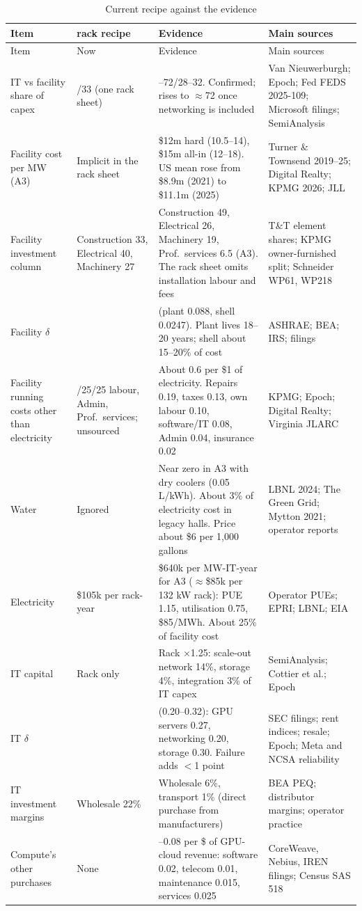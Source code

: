 \begin{longtable}{>{\raggedright\arraybackslash}p{2.8cm}>{\raggedright\arraybackslash}p{3.0cm}>{\raggedright\arraybackslash}p{4.8cm}>{\raggedright\arraybackslash}p{3.8cm}}
\caption{Current recipe against the evidence}\label{tab:changes}\\
\toprule
Item & 2026 rack recipe & Evidence & Main sources \\
\midrule\endfirsthead
\toprule
Item & Now & Evidence & Main sources \\
\midrule\endhead
IT vs facility share of capex & 67/33 (one rack sheet) & 68--72/28--32. Confirmed; rises to $\approx$72 once networking is included & Van Nieuwerburgh; Epoch; Fed FEDS 2025-109; Microsoft filings; SemiAnalysis \\
Facility cost per MW (A3) & Implicit in the rack sheet & \$12m hard (10.5--14), \$15m all-in (12--18). US mean rose from \$8.9m (2021) to \$11.1m (2025) & Turner \& Townsend 2019--25; Digital Realty; KPMG 2026; JLL \\
Facility investment column & Construction 33, Electrical 40, Machinery 27 & Construction 49, Electrical 26, Machinery 19, Prof.\ services 6.5 (A3). The rack sheet omits installation labour and fees & T\&T element shares; KPMG owner-furnished split; Schneider WP61, WP218 \\
Facility $\delta$ & 0.075 & 0.078 (plant 0.088, shell 0.0247). Plant lives 18--20 years; shell about 15--20\% of cost & ASHRAE; BEA; IRS; filings \\
Facility running costs other than electricity & 50/25/25 labour, Admin, Prof.\ services; unsourced & About 0.6 per \$1 of electricity. Repairs 0.19, taxes 0.13, own labour 0.10, software/IT 0.08, Admin 0.04, insurance 0.02 & KPMG; Epoch; Digital Realty; Virginia JLARC \\
Water & Ignored & Near zero in A3 with dry coolers (0.05 L/kWh). About 3\% of electricity cost in legacy halls. Price about \$6 per 1{,}000 gallons & LBNL 2024; The Green Grid; Mytton 2021; operator reports \\
Electricity & \$105k per rack-year & \$640k per MW-IT-year for A3 ($\approx$\$85k per 132 kW rack): PUE 1.15, utilisation 0.75, \$85/MWh. About 25\% of facility cost & Operator PUEs; EPRI; LBNL; EIA \\
IT capital & Rack only & Rack $\times$1.25: scale-out network 14\%, storage 4\%, integration 3\% of IT capex & SemiAnalysis; Cottier et al.; Epoch \\
IT $\delta$ & 0.25 & 0.26 (0.20--0.32): GPU servers 0.27, networking 0.20, storage 0.30. Failure adds $<$1 point & 31 SEC filings; rent indices; resale; Epoch; Meta and NCSA reliability \\
IT investment margins & Wholesale 22\% & Wholesale 6\%, transport 1\% (direct purchase from manufacturers) & BEA PEQ; distributor margins; operator practice \\
Compute's other purchases & None & 0.06--0.08 per \$ of GPU-cloud revenue: software 0.02, telecom 0.01, maintenance 0.015, services 0.025 & CoreWeave, Nebius, IREN filings; Census SAS 518 \\
\bottomrule
\end{longtable}

